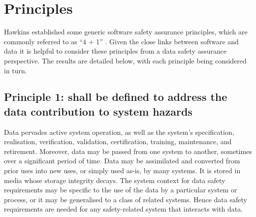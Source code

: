 %
%
\chapter{Principles} \label{bkm:principles}

Hawkins  established some generic software safety assurance principles, which are commonly referred to as ``4 + 1'' \cite{citation:hawkins2013principles}. Given the close links between software and data it is helpful to consider these principles from a data safety assurance perspective. The results are detailed below, with each principle being considered in turn.

\section{Principle 1:  shall be defined to address the data contribution to system hazards}
Data pervades active system operation, as well as the system's specification, realisation, \gls{verification}, \gls{validation}, certification,  training, maintenance, and retirement. Moreover, data may be passed from one system to another, sometimes over a significant period of time. Data may be assimilated and converted from prior uses into new uses, or simply used as-is, by many systems. It is stored in media whose storage \gls{integrity} decays. The system context for \glspl{data safety requirement} may be specific to the use of the data by a particular system or process, or it may be generalised to a class of related systems. Hence \glspl{data safety requirement} are needed for any safety-related system that interacts with data. 
